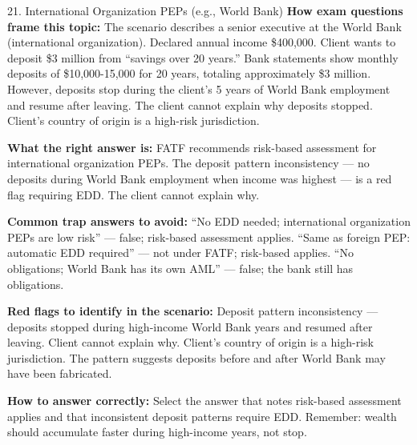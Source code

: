 \documentclass[11pt,a4paper]{beamer}
\begin{document}
	\begin{frame}{21. International Organization PEPs (e.g., World Bank)}
		\tiny
		\noindent\textbf{How exam questions frame this topic:} The scenario describes a senior executive at the World Bank (international organization). Declared annual income \$400,000. Client wants to deposit \$3 million from “savings over 20 years.” Bank statements show monthly deposits of \$10,000-15,000 for 20 years, totaling approximately \$3 million. However, deposits stop during the client's 5 years of World Bank employment and resume after leaving. The client cannot explain why deposits stopped. Client's country of origin is a high-risk jurisdiction.
		
		\vspace{0.1cm}
		\noindent\textbf{What the right answer is:} FATF recommends risk-based assessment for international organization PEPs. The deposit pattern inconsistency — no deposits during World Bank employment when income was highest — is a red flag requiring EDD. The client cannot explain why.
		
		\vspace{0.1cm}
		\noindent\textbf{Common trap answers to avoid:} “No EDD needed; international organization PEPs are low risk” — false; risk-based assessment applies. “Same as foreign PEP: automatic EDD required” — not under FATF; risk-based applies. “No obligations; World Bank has its own AML” — false; the bank still has obligations.
		
		\vspace{0.1cm}
		\noindent\textbf{Red flags to identify in the scenario:} Deposit pattern inconsistency — deposits stopped during high-income World Bank years and resumed after leaving. Client cannot explain why. Client's country of origin is a high-risk jurisdiction. The pattern suggests deposits before and after World Bank may have been fabricated.
		
		\vspace{0.1cm}
		\noindent\textbf{How to answer correctly:} Select the answer that notes risk-based assessment applies and that inconsistent deposit patterns require EDD. Remember: wealth should accumulate faster during high-income years, not stop.
	\end{frame}
	
\end{document}
